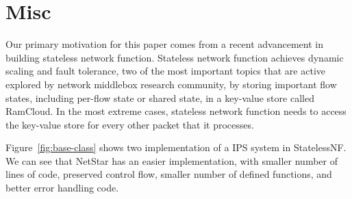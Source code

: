 \section{Misc}

Our primary motivation for this paper comes from a recent advancement in building stateless network function. Stateless network function achieves dynamic scaling and fault tolerance, two of the most important topics that are active explored by network middlebox research community, by storing important flow states, including per-flow state or shared state, in a key-value store called RamCloud. In the most extreme cases, stateless network function needs to access the key-value store for every other packet that it processes.

Figure~\ref{fig:base-class} shows two implementation of a IPS system in StatelessNF. We can see that NetStar has an easier implementation, with smaller number of lines of code, preserved control flow, smaller number of defined functions, and better error handling code.

